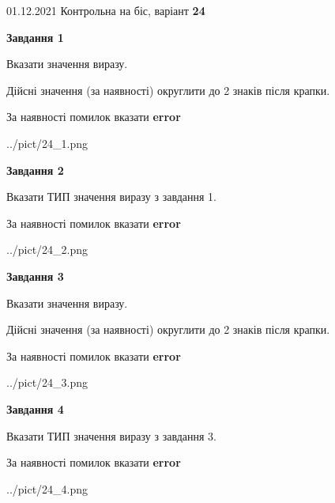 \documentclass[11pt, ukrainian]{article}
\begin{document}
{01.12.2021 Контрольна на біс, варіант  \No \textbf { 24 }\par}
{
\begin {large}
{\begin {center}\textbf{Завдання 1}\end {center}}\par
Вказати значення виразу. \par
Дійсні значення (за наявності) округлити до 2 знаків після крапки. \par
За наявності помилок вказати \textbf{error}

\begin{center}
	{../pict/24_1.png}
\end{center}
\newpage

{\begin {center}\textbf{Завдання 2}\end {center}}\par
Вказати ТИП значення виразу з завдання 1. \par
За наявності помилок вказати \textbf{error}

\begin{center}
	{../pict/24_2.png}
\end{center}
\newpage

{\begin {center}\textbf{Завдання 3}\end {center}}\par
Вказати значення виразу. \par
Дійсні значення (за наявності) округлити до 2 знаків після крапки. \par
За наявності помилок вказати \textbf{error}

\begin{center}
	{../pict/24_3.png}
\end{center}
\newpage

{\begin {center}\textbf{Завдання 4}\end {center}}\par
Вказати ТИП значення виразу з завдання 3. \par
За наявності помилок вказати \textbf{error}

\begin{center}
	{../pict/24_4.png}
\end{center}
\newpage


\end{large}}
\end{document}
